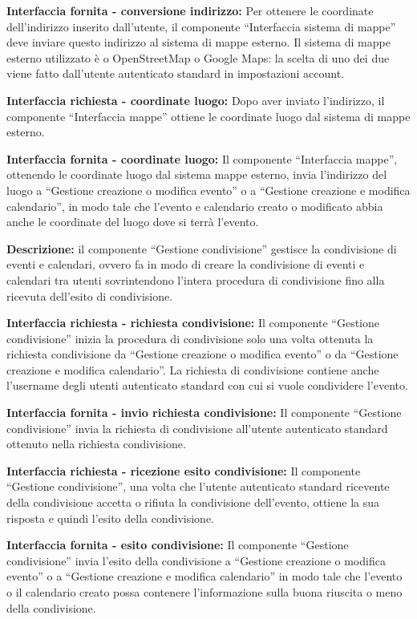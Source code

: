 \begin{listaPersonale}[]{}
    \textbf{Interfaccia fornita - conversione indirizzo:} Per ottenere le coordinate dell'indirizzo inserito dall'utente, il componente “Interfaccia sistema di mappe” deve inviare questo indirizzo al sistema di mappe esterno. Il sistema di mappe esterno utilizzato è o OpenStreetMap o Google Maps: la scelta di uno dei due viene fatto dall'utente autenticato standard in impostazioni account.

    \textbf{Interfaccia richiesta - coordinate luogo:} Dopo aver inviato l'indirizzo, il componente “Interfaccia mappe” ottiene le coordinate luogo dal sistema di mappe esterno.

    \textbf{Interfaccia fornita - coordinate luogo:} Il componente “Interfaccia mappe”, ottenendo le coordinate luogo dal sistema mappe esterno, invia l'indirizzo del luogo a “Gestione creazione o modifica evento” o a “Gestione creazione e modifica calendario”, in modo tale che l'evento e calendario creato o modificato abbia anche le coordinate del luogo dove si terrà l'evento.




    \textbf{Descrizione:} il componente “Gestione condivisione” gestisce la condivisione di eventi e calendari, ovvero fa in modo di creare la condivisione di eventi e calendari tra utenti sovrintendono l'intera procedura di condivisione fino alla ricevuta dell'esito di condivisione.

    \textbf{Interfaccia richiesta - richiesta condivisione:} Il componente “Gestione condivisione” inizia la procedura di condivisione solo una volta ottenuta la richiesta condivisione da “Gestione creazione o modifica evento” o da “Gestione creazione e modifica calendario”. La richiesta di condivisione contiene anche l'username degli utenti autenticato standard con cui si vuole condividere l'evento.

    \textbf{Interfaccia fornita - invio richiesta condivisione:} Il componente “Gestione condivisione” invia la richiesta di condivisione all'utente autenticato standard ottenuto nella richiesta condivisione.

    \textbf{Interfaccia richiesta - ricezione esito condivisione:} Il componente “Gestione condivisione”, una volta che l'utente autenticato standard ricevente della condivisione accetta o rifiuta la condivisione dell'evento, ottiene la sua risposta e quindi l'esito della condivisione.

    \textbf{Interfaccia fornita - esito condivisione:} Il componente “Gestione condivisione” invia l'esito della condivisione a “Gestione creazione o modifica evento” o a “Gestione creazione e modifica calendario” in modo tale che l'evento o il calendario creato possa contenere l'informazione sulla buona riuscita o meno della condivisione.



\end{listaPersonale}
